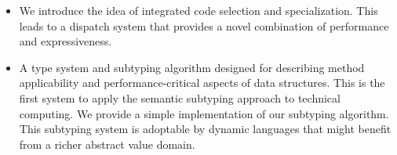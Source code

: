 \begin{itemize}
\iffalse
Our first contribution is a discussion of the nature of technical computing
that suggests which language-level abstractions might best support real use
cases.
Simply put technical computing has by and large happened
without sufficient probing and analysis as to what it is.
Our looking at the space in this manner has lead to a novel design.
The success of this design is resonating with users worldwide.

Based on the theory that technical computing is characterized by complex
operators and particular combinations of binding time behavior.
\fi

\item We introduce the idea of integrated code selection and specialization.
This leads to a dispatch system that provides a novel combination of
performance and expressiveness.







\item A type system and subtyping algorithm designed for describing
method applicability and performance-critical aspects of data structures.
This is the first system to apply the semantic subtyping approach
to technical computing.
We provide a simple implementation of our subtyping algorithm.
This subtyping system is adoptable by dynamic languages that might
benefit from a richer abstract value domain.


\end{itemize}
